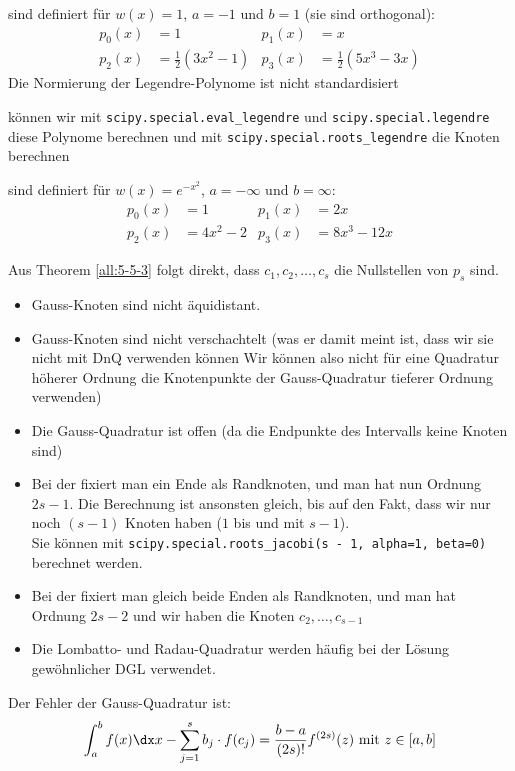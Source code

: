  sind definiert für $w(x) = 1$, $a = -1$ und $b = 1$ (sie sind orthogonal):
\begin{align*}
    p_0(x) & = 1                     & p_1(x) & = x                      \\
    p_2(x) & = \frac{1}{2}(3x^2 - 1) & p_3(x) & = \frac{1}{2}(5x^3 - 3x)
\end{align*}
Die Normierung der Legendre-Polynome ist nicht standardisiert

\innumpy können wir mit
\texttt{scipy.special.eval\_legendre} und \texttt{scipy.special.legendre} diese Polynome berechnen und mit
\texttt{scipy.special.roots\_legendre} die Knoten berechnen

 sind definiert für $w(x) = e^{-x^2}$, $a = -\infty$ und $b = \infty$:
\begin{align*}
    p_0(x) & = 1        & p_1(x) & = 2x         \\
    p_2(x) & = 4x^2 - 2 & p_3(x) & = 8x^3 - 12x
\end{align*}

\inlineremark Aus Theorem \ref{all:5-5-3} folgt direkt, dass $c_1, c_2, \ldots, c_s$ die Nullstellen von $p_s$ sind.

\begin{itemize}
    \item Gauss-Knoten sind nicht äquidistant.
    \item Gauss-Knoten sind nicht verschachtelt (was er damit meint ist, dass wir sie nicht mit DnQ verwenden können \textemdash
          Wir können also nicht für eine Quadratur höherer Ordnung die Knotenpunkte der Gauss-Quadratur tieferer Ordnung verwenden)
    \item Die Gauss-Quadratur ist offen (da die Endpunkte des Intervalls keine Knoten sind)
    \item Bei der  fixiert man ein Ende als Randknoten, und man hat nun Ordnung $2s - 1$. 
        Die Berechnung ist ansonsten gleich, bis auf den Fakt, dass wir nur noch $(s - 1)$ Knoten haben ($1$ bis und mit $s - 1$).\\
        Sie können mit \texttt{scipy.special.roots\_jacobi(s - 1, alpha=1, beta=0)} berechnet werden.
    \item Bei der  fixiert man gleich beide Enden als Randknoten, und man hat Ordnung $2s - 2$ und wir haben die Knoten $c_2, \ldots, c_{s - 1}$
    \item Die Lombatto- und Radau-Quadratur werden häufig bei der Lösung gewöhnlicher DGL verwendet.
\end{itemize}
Der Fehler der Gauss-Quadratur ist:
\rmvspace
\begin{align*}
    \int_{a}^{b} f(x) \dx x - \sum_{j = 1}^{s} b_j \cdot f(c_j) = \frac{b - a}{(2s)!} f^{(2s)}(z) \text{ mit } z \in [a, b]
\end{align*}

